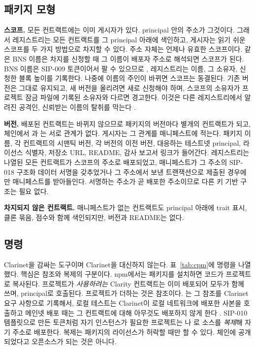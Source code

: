 \subsection{패키지 모형}

\textbf{스코프.} 모든 컨트랙트에는 이미 게시자가 있다. principal 안의 주소가 그것이다. 그래서 레지스트리는 모든 컨트랙트를 그 principal 아래에 색인하고, 게시자는 읽기 쉬운 스코프를 두 가지 방법으로 차지할 수 있다. 주소 자체는 언제나 유효한 스코프이다.  같은 BNS 이름은 차지를 신청할 때 그 이름이 배포자 주소로 해석되면 스코프가 된다. BNS 이름은 SIP-009 토큰이어서 팔 수 있으므로 \cite{bnsv2}, 레지스트리는 이름, 그 소유자, 신청한 블록 높이를 기록한다. 나중에 이름의 주인이 바뀌면 스코프는 동결된다. 기존 버전은 그대로 유지되고, 새 버전을 올리려면 새로 신청해야 하며, 스코프의 소유자가 프로젝트 잠금 파일에 기록된 소유자와 다르면  경고한다. 이것은 다른 레지스트리에서 알려진 공격인, 신뢰받는 이름의 탈취를 막는다 \cite{ladisa2023sok}.

\textbf{버전.} 배포된 컨트랙트는 바뀌지 않으므로 패키지의 버전마다 별개의 컨트랙트가 되고, 체인에서 과 는 서로 관계가 없다. 게시자는 그 관계를 매니페스트에 적는다. 패키지 이름, 각 컨트랙트의 시맨틱 버전, 각 버전의 이전 버전, 대응하는 테스트넷 principal, 라이선스 식별자, 저장소 URL, README, 감사 보고서 링크가 들어간다. 레지스트리는 나열된 모든 컨트랙트가 스코프의 주소로 배포되었고, 매니페스트가 그 주소의 SIP-018 구조화 데이터 서명을 갖추었거나 \cite{sip018} 그 주소에서 보낸 트랜잭션으로 제출된 경우에만 매니페스트를 받아들인다. 서명하는 주소가 곧 배포한 주소이므로 다른 키 기반 구조는 필요 없다.

\textbf{차지되지 않은 컨트랙트.} 매니페스트가 없는 컨트랙트도 principal 아래에 trait 표시, 클론 묶음, 점수와 함께 색인되지만, 버전과 README는 없다.

\subsection{명령}

 Clarinet을 감싸는 도구이며 Clarinet을 대신하지 않는다. 표~\ref{tab:cpm}에 명령을 나열했다. 핵심은 참조와 복제의 구분이다. npm에서는 패키지를 설치하면 코드가 프로젝트로 복사된다. 프로젝트가 \emph{사용하려는} Clarity 컨트랙트는 이미 배포되어 모두가 함께 쓰며, principal로 호출된다. 프로젝트가 더하는 것은 참조이다. 는 그 참조를 Clarinet 요구 사항으로 기록해서, 로컬 테스트는 Clarinet이 로컬 네트워크에 배포한 사본을 호출하고 메인넷 배포 때는 그 컨트랙트에 대해 아무것도 배포하지 않게 한다 \cite{clarinet}. SIP-010 템플릿으로 만든 토큰처럼 자기 인스턴스가 필요한 프로젝트는 나 로 소스를 \emph{복제}해 자기 주소로 배포한다. 복제는 패키지의 라이선스가 허락할 때만 할 수 있다. 체인에 공개되었다고 오픈소스가 되는 것은 아니다.

